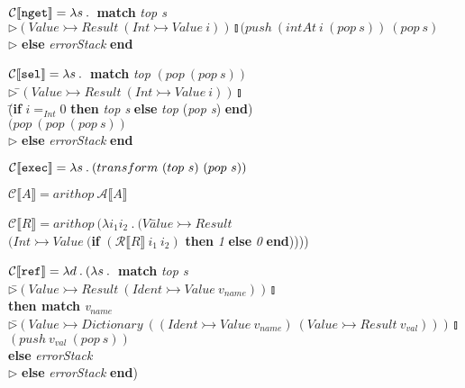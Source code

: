 \documentclass[12pt]{report}
\begin{document}
\begin{tabbing}
$\mathcal{C}\llbracket {\tt nget}\rrbracket=\lambda s\:.\:$ \={\bf match} {\em top s} \\
\>$\triangleright (Value\rightarrowtail Result\ (Int\rightarrowtail Value\ i))\talloblong (push\ (intAt\ i\ (pop\ s))\ (pop\ s)$ \\
\>$\triangleright$ {\bf else} {\em errorStack} {\bf end}
\end{tabbing}

\begin{tabbing}
$\mathcal{C}\llbracket {\tt sel}\rrbracket=\lambda s\:.\:$ \={\bf match} {\em top} $(pop\ (pop\ s))$ \\
\>$\triangleright\ $\=$(Value\rightarrowtail Result\ (Int\rightarrowtail Value\ i))\talloblong $\\
\> \=({\bf if} $i=_{Int}0$ {\bf then} {\em top s} {\bf else} {\em top} ({\em pop s}) {\bf end}) \\
\>\>\>$(pop\ (pop\ (pop\ s))$\\
\>$\triangleright$ {\bf else} {\em errorStack} {\bf end}
\end{tabbing}
$\mathcal{C}\llbracket {\tt exec}\rrbracket=\lambda s\:.\:(transform\ (top\ s)\ (pop\ s))$

$\mathcal{C}\llbracket A\rrbracket=arithop\ \mathcal{A}\llbracket A\rrbracket$

\begin{tabbing}
$\mathcal{C}\llbracket R\rrbracket=arithop\ (\lambda i_1i_2\:.\:(Va$\=$lue\rightarrowtail Result$\\
\>$(Int\rightarrowtail Value\ (${\bf if} $(\mathcal{R}\llbracket R\rrbracket\ i_1\ i_2)$ {\bf then} {\em 1} {\bf else} {\em 0} {\bf end}))))
\end{tabbing}

\begin{tabbing}
$\mathcal{C}\llbracket {\tt ref}\rrbracket=\lambda d \:.\: (\lambda s \:.\: $ \={\bf match} {\em top s} \\
\>$\triangleright $\=$(Value\rightarrowtail Result\ (Ident\rightarrowtail Value\ v_{name}))\talloblong$ \\
\>\>\={\bf then match} {\em v$_{name}$} \\
\>\>\>$\triangleright $\=$(Value\rightarrowtail Dictionary\ ((Ident\rightarrowtail Value\ v_{name})\ (Value\rightarrowtail Result\ v_{val})))\talloblong$ \\
\>\>\>$(push\ v_{val}\ (pop\ s)) $ \\
\>\>\={\bf else} {\em errorStack} \\
\>$\triangleright$ {\bf else} {\em errorStack} {\bf end})
\end{tabbing}
\end{document}
